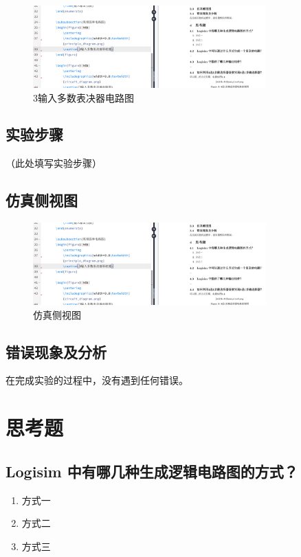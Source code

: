 \documentclass{article}
\begin{document}
\begin{figure}[htb]
  \centering
  \includegraphics[width=0.8\textwidth]{image.png} %
  \caption{3输入多数表决器电路图}
\end{figure}

\subsection{实验步骤}
（此处填写实验步骤）

\subsection{仿真侧视图}
\begin{figure}[htb]
  \centering
  \includegraphics[width=0.8\textwidth]{image.png} %
  \caption{仿真侧视图}
\end{figure}

\subsection{错误现象及分析}
在完成实验的过程中，没有遇到任何错误。

\section{思考题}
\subsection{Logisim 中有哪几种生成逻辑电路图的方式？}
\begin{enumerate}
  \item 方式一
  \item 方式二
  \item 方式三
\end{enumerate}
\end{document}
